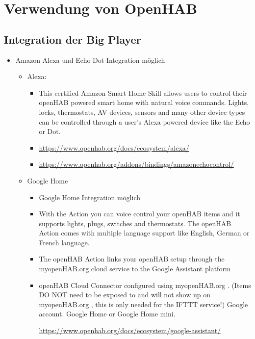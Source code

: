 \section{Verwendung von OpenHAB}
\subsection{Integration der Big Player}
\begin{itemize}
	\item Amazon Alexa und Echo Dot Integration möglich
	\begin{itemize}
		\item Alexa:
		\begin{itemize}
			\item This certified Amazon Smart Home Skill allows users to control their openHAB powered smart home with natural voice commands. Lights, locks, thermostats, AV devices, sensors and many other device types can be controlled through a user's Alexa powered device like the Echo or Dot.
			\item \url{https://www.openhab.org/docs/ecosystem/alexa/}
			\item \url{https://www.openhab.org/addons/bindings/amazonechocontrol/}
		\end{itemize} 
		\item Google Home
		\begin{itemize}
			\item Google Home Integration möglich
			\item With the Action you can voice control your openHAB items and it supports lights, plugs, switches and thermostats. The openHAB Action comes with multiple language support like English, German or French language.
			\item The openHAB Action links your openHAB setup through the myopenHAB.org cloud service to the Google Assistant platform
			\item openHAB Cloud Connector configured using myopenHAB.org . (Items DO NOT need to be exposed to and will not show up on myopenHAB.org
			, this is only needed for the IFTTT service!)
			Google account.
			Google Home or Google Home mini.
			
			\url{https://www.openhab.org/docs/ecosystem/google-assistant/}
		\end{itemize} 
	\end{itemize}
	
\end{itemize}

